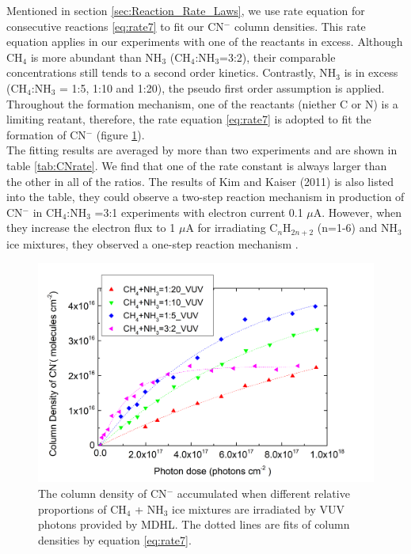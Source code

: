 Mentioned in section \ref{sec:Reaction_Rate_Laws}, we use rate equation for consecutive reactions \ref{eq:rate7} to fit our CN$^-$ column densities. This rate equation applies in our experiments with one of the reactants in excess. Although CH$_4$ is more abundant than NH$_3$ (CH$_4$:NH$_3$=3:2), their comparable concentrations still tends to a second order kinetics. Contrastly, NH$_3$ is in excess (CH$_4$:NH$_3$ = 1:5, 1:10 and 1:20), the pseudo first order assumption is applied. Throughout the formation mechanism, one of the reactants (niether C or N) is a limiting reatant, therefore, the rate equation \ref{eq:rate7} is adopted to fit the formation of CN$^-$ (figure \ref{fig:CNrate}).\\

The fitting results are averaged by more than two experiments and are shown in table \ref{tab:CNrate}. We find that one of the rate constant is always larger than the other in all of the ratios. The results of Kim and Kaiser (2011) is also listed into the table, they could observe a two-step reaction mechanism in production of CN$^-$ in CH$_4$:NH$_3$ =3:1 experiments with electron current 0.1 $\mu$A. However, when they increase the electron flux to 1 $\mu$A for irradiating C$_n$H$_{2n+2}$ (n=1-6) and NH$_3$ ice mixtures, they observed a one-step reaction mechanism \cite{kim}.\\

\begin{figure}
\centering
\includegraphics[width=\textwidth]{figures/chapter3/CN_rate_VUV.png}
\caption{The column density of CN$^-$ accumulated when different relative proportions of CH$_4$ + NH$_3$ ice mixtures are irradiated by VUV photons provided by MDHL. The dotted lines are fits of column densities by equation \ref{eq:rate7}.}
\label{fig:CNrate}
\end{figure}


